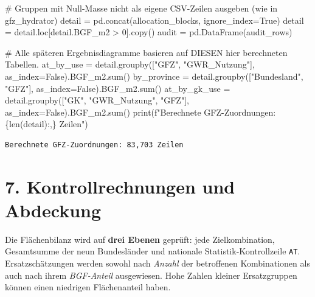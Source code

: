 \documentclass[
  ngerman,
  a4paper,
  DIV=11]{scrreprt}
\newenvironment{Shaded}{\begin{snugshade}}{\end{snugshade}}
\newcommand{\BuiltInTok}[1]{\textcolor[rgb]{0.00,0.23,0.31}{#1}}
\newcommand{\CommentTok}[1]{\textcolor[rgb]{0.37,0.37,0.37}{#1}}
\newcommand{\DecValTok}[1]{\textcolor[rgb]{0.68,0.00,0.00}{#1}}
\newcommand{\NormalTok}[1]{\textcolor[rgb]{0.00,0.23,0.31}{#1}}
\newcommand{\OperatorTok}[1]{\textcolor[rgb]{0.37,0.37,0.37}{#1}}
\newcommand{\SpecialCharTok}[1]{\textcolor[rgb]{0.37,0.37,0.37}{#1}}
\newcommand{\SpecialStringTok}[1]{\textcolor[rgb]{0.13,0.47,0.30}{#1}}
\newcommand{\StringTok}[1]{\textcolor[rgb]{0.13,0.47,0.30}{#1}}
\newcommand{\VariableTok}[1]{\textcolor[rgb]{0.07,0.07,0.07}{#1}}
\begin{document}
\begin{Shaded}
\begin{Highlighting}[]
\CommentTok{\# Gruppen mit Null{-}Masse nicht als eigene CSV{-}Zeilen ausgeben (wie in gfz\_hydrator)}
\NormalTok{detail }\OperatorTok{=}\NormalTok{ pd.concat(allocation\_blocks, ignore\_index}\OperatorTok{=}\VariableTok{True}\NormalTok{)}
\NormalTok{detail }\OperatorTok{=}\NormalTok{ detail.loc[detail.BGF\_m2 }\OperatorTok{\textgreater{}} \DecValTok{0}\NormalTok{].copy()}
\NormalTok{audit }\OperatorTok{=}\NormalTok{ pd.DataFrame(audit\_rows)}

\CommentTok{\# Alle späteren Ergebnisdiagramme basieren auf DIESEN hier berechneten Tabellen.}
\NormalTok{at\_by\_use }\OperatorTok{=}\NormalTok{ detail.groupby([}\StringTok{"GFZ"}\NormalTok{, }\StringTok{"GWR\_Nutzung"}\NormalTok{], as\_index}\OperatorTok{=}\VariableTok{False}\NormalTok{).BGF\_m2.}\BuiltInTok{sum}\NormalTok{()}
\NormalTok{by\_province }\OperatorTok{=}\NormalTok{ detail.groupby([}\StringTok{"Bundesland"}\NormalTok{, }\StringTok{"GFZ"}\NormalTok{], as\_index}\OperatorTok{=}\VariableTok{False}\NormalTok{).BGF\_m2.}\BuiltInTok{sum}\NormalTok{()}
\NormalTok{at\_by\_gk\_use }\OperatorTok{=}\NormalTok{ detail.groupby([}\StringTok{"GK"}\NormalTok{, }\StringTok{"GWR\_Nutzung"}\NormalTok{, }\StringTok{"GFZ"}\NormalTok{], as\_index}\OperatorTok{=}\VariableTok{False}\NormalTok{).BGF\_m2.}\BuiltInTok{sum}\NormalTok{()}
\BuiltInTok{print}\NormalTok{(}\SpecialStringTok{f"Berechnete GFZ{-}Zuordnungen: }\SpecialCharTok{\{}\BuiltInTok{len}\NormalTok{(detail)}\SpecialCharTok{:,\}}\SpecialStringTok{ Zeilen"}\NormalTok{)}
\end{Highlighting}
\end{Shaded}

\begin{verbatim}
Berechnete GFZ-Zuordnungen: 83,703 Zeilen
\end{verbatim}

\section{7. Kontrollrechnungen und
Abdeckung}\label{kontrollrechnungen-und-abdeckung}

Die Flächenbilanz wird auf \textbf{drei Ebenen} geprüft: jede
Zielkombination, Gesamtsumme der neun Bundesländer und nationale
Statistik-Kontrollzeile \texttt{AT}. Ersatzschätzungen werden sowohl
nach \emph{Anzahl} der betroffenen Kombinationen als auch nach ihrem
\emph{BGF-Anteil} ausgewiesen. Hohe Zahlen kleiner Ersatzgruppen können
einen niedrigen Flächenanteil haben.
\end{document}
